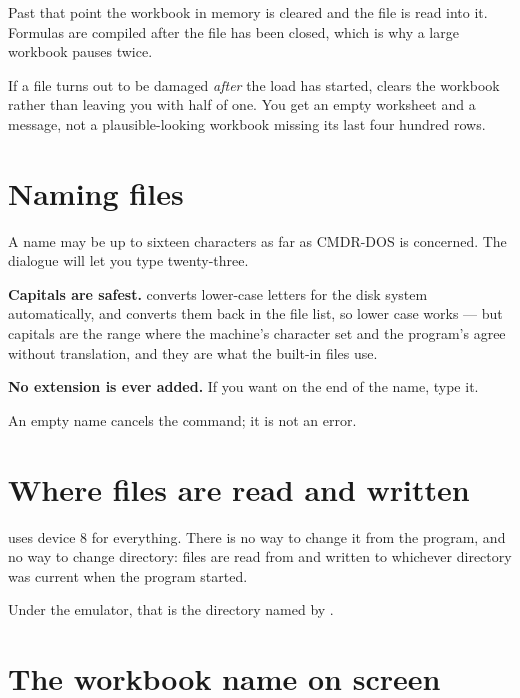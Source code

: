 Past that point the workbook in memory is cleared and the file is read into it.
Formulas are compiled after the file has been closed, which is why a large
workbook pauses twice.

\begin{ccnote}
If a file turns out to be damaged \emph{after} the load has started, \ccprod{}
clears the workbook rather than leaving you with half of one. You get an empty
worksheet and a message, not a plausible-looking workbook missing its last
four hundred rows.
\end{ccnote}

\section{Naming files}

\begin{ccsteps}
\item A name may be up to sixteen characters as far as CMDR-DOS is concerned.
The dialogue will let you type twenty-three.
\item \textbf{Capitals are safest.} \ccprod{} converts lower-case letters for
the disk system automatically, and converts them back in the file list, so
lower case works --- but capitals are the range where the machine's character
set and the program's agree without translation, and they are what the built-in
files use.
\item \textbf{No extension is ever added.} If you want  on the end
of the name, type it.
\item An empty name cancels the command; it is not an error.
\end{ccsteps}

\section{Where files are read and written}

\ccprod{} uses device 8 for everything. There is no way to change it from the
program, and no way to change directory: files are read from and written to
whichever directory was current when the program started.

Under the emulator, that is the directory named by .

\section{The workbook name on screen}

